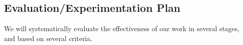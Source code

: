 \documentclass[11pt]{proposalnsf}
\newcommand{\dan}[1]{\textcolor{blue}{{\it [Dan says: #1]}}}
\newlength\q %
\begin{document}
\begin{sloppypar}









\subsection{Evaluation/Experimentation Plan} 

We will systematically evaluate the effectiveness of our work in several stages, and based on several criteria. %



\end{sloppypar}
\end{document}
